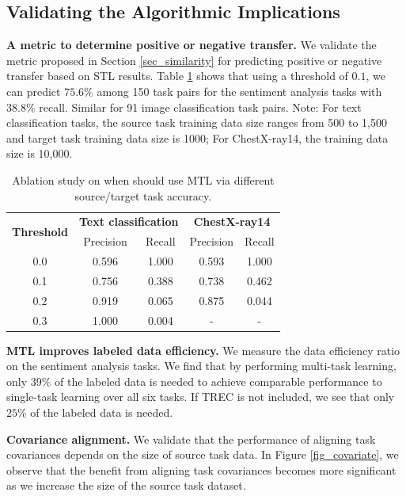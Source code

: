 \subsection{Validating the Algorithmic Implications}

\textbf{A metric to determine positive or negative transfer.}
We validate the metric proposed in Section \ref{sec_similarity} for predicting positive or negative transfer based on STL results.
Table \ref{tab:mtl_better_than_stl} shows that using a threshold of $0.1$, we can predict $75.6\%$ among 150 task pairs for the sentiment analysis tasks with $38.8\%$ recall.
Similar for 91 image classification task pairs.
Note: For text classification tasks, the source task training data size ranges from 500 to 1,500 and target task training data size is 1000; For ChestX-ray14, the training data size is 10,000.

\begin{table}
\begin{center}
  \begin{tabular}{c c c c c}
  \toprule
    \multirow{2}{*}{{\bf Threshold}}  & \multicolumn{2}{c}{{\bf Text classification}} & \multicolumn{2}{c}{{\bf ChestX-ray14}} \\
    & Precision &  Recall & Precision &  Recall \\
    \cmidrule(lr){1-1} \cmidrule(lr){2-3} \cmidrule(lr){4-5}
    0.0 & 0.596 & 1.000 & 0.593 & 1.000 \\
    0.1 & 0.756 & 0.388 & 0.738 & 0.462 \\
    0.2 & 0.919 & 0.065 & 0.875 & 0.044 \\	
    0.3 & 1.000 & 0.004 &     - &     - \\
  \bottomrule
  \end{tabular}
\end{center}
\caption{Ablation study on when should use MTL via different source/target task accuracy.}
\label{tab:mtl_better_than_stl}
\end{table}

\textbf{MTL improves labeled data efficiency.}
We measure the data efficiency ratio on the sentiment analysis tasks.
We find that by performing multi-task learning, only $39\%$ of the labeled data is needed to achieve comparable performance to single-task learning over all six tasks.
If TREC is not included, we see that only $25\%$ of the labeled data is needed.


\textbf{Covariance alignment.}
We validate that the performance of aligning task covariances depends on the size of source task data.
In Figure \ref{fig_covariate}, we observe that the benefit from aligning task covariances becomes more significant as we increase the size of the source task dataset.


